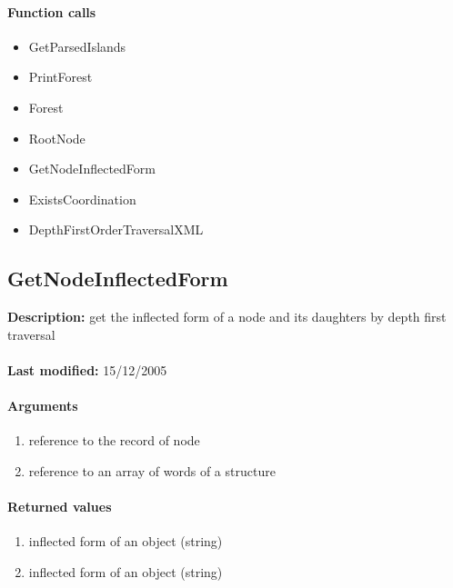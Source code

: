 \paragraph{Function calls}
\begin{itemize}
\item GetParsedIslands
\item PrintForest
\item Forest
\item RootNode
\item GetNodeInflectedForm
\item ExistsCoordination
\item DepthFirstOrderTraversalXML
\end{itemize}

\subsection{GetNodeInflectedForm}
\textbf{Description:} get the inflected form of a node and its daughters by depth first traversal\\
\\\textbf{Last modified:} 15/12/2005

\paragraph{Arguments}
\begin{enumerate}
\item reference to the record of node
\item reference to an array of words of a structure
\end{enumerate}

\paragraph{Returned values}
\begin{enumerate}
\item inflected form of an object (string)
\item inflected form of an object (string)
\end{enumerate}

